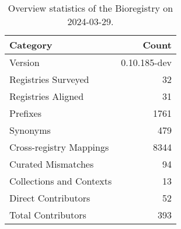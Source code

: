 \begin{table}
\caption{Overview statistics of the Bioregistry on 2024-03-29.}
\label{tab:bioregistry-summary}
\begin{tabular}{lr}
\toprule
Category & Count \\
\midrule
Version & 0.10.185-dev \\
Registries Surveyed & 32 \\
Registries Aligned & 31 \\
Prefixes & 1761 \\
Synonyms & 479 \\
Cross-registry Mappings & 8344 \\
Curated Mismatches & 94 \\
Collections and Contexts & 13 \\
Direct Contributors & 52 \\
Total Contributors & 393 \\
\bottomrule
\end{tabular}
\end{table}
